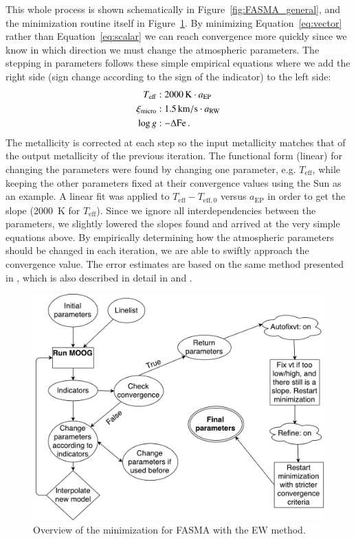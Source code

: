 \documentclass{aa}
\begin{document}
This whole process is shown schematically in Figure~\ref{fig:FASMA_general}, and
the minimization routine itself in Figure~\ref{fig:FASMA_minimization}. By
minimizing Equation~\ref{eq:vector} rather than Equation~\ref{eq:scalar} we can
reach convergence more quickly since we know in which direction we must change
the atmospheric parameters. The stepping in parameters follows these simple
empirical equations where we add the right side (sign change according to the
sign of the indicator) to the left side:
\begin{align}
    T_\mathrm{eff}     &: \SI{2000}{K} \cdot a_\mathrm{EP}   \\
    \xi_\mathrm{micro} &: \SI{1.5}{km/s} \cdot a_\mathrm{RW} \\
    \log g             &: -\Delta\ion{Fe}.
\end{align}
The metallicity is corrected at each step so the input metallicity matches that
of the output metallicity of the previous iteration. The functional form
(linear) for changing the parameters were found by changing one parameter, e.g.
$T_\mathrm{eff}$, while keeping the other parameters fixed at their convergence
values using the Sun as an example. A linear fit was applied to $T_\mathrm{eff} -
T_\mathrm{eff,0}$ versus $a_\mathrm{EP}$ in order to get the slope (\SI{2000}{K}
for $T_\mathrm{eff}$). Since we ignore all interdependencies between the
parameters, we slightly lowered the slopes found and arrived at the very simple
equations above. By empirically determining how the atmospheric parameters
should be changed in each iteration, we are able to swiftly approach the
convergence value. The error estimates are based on the same method presented in
\citet{Gonzalez2000}, which is also described in detail in \citet{Santos2003}
and \citet{Andreasen2016}.

\begin{figure}[tpb]
    \centering
    \includegraphics[width=1.0\linewidth,natwidth=700,natheight=650]{figures/FASMA_minimization.pdf}
    \caption{Overview of the minimization for FASMA with the
    EW method.}
    \label{fig:FASMA_minimization}
\end{figure}
\end{document}
